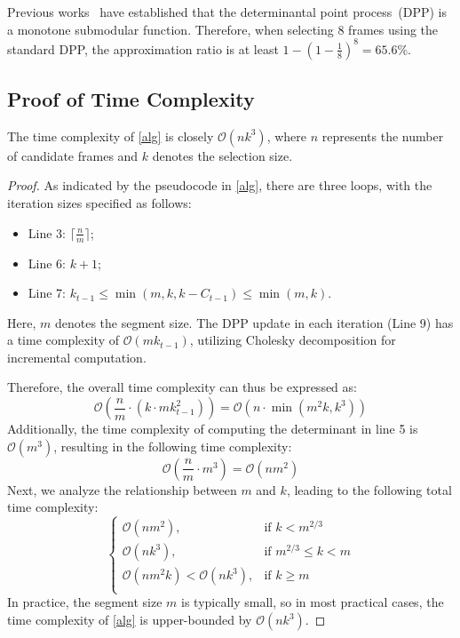 Previous works~\cite{fujishige2005submodular,krause2014submodular} have established that the determinantal point process~(DPP) is a monotone submodular function.
Therefore, when selecting 8 frames using the standard DPP, the approximation ratio is at least \mbox{\( 1 - \left( 1 - \frac{1}{8} \right)^8 = 65.6\% \).}


\subsection{Proof of Time Complexity}
The time complexity of \cref{alg} is closely $\mathcal{O}(nk^3)$, where $n$ represents the number of candidate frames and $k$ denotes the selection size.


\begin{proof}
    As indicated by the pseudocode in \cref{alg}, there are three loops, with the iteration sizes specified as follows:
    \begin{itemize}
        \item Line 3: $\lceil \frac{n}{m} \rceil$;
        \item Line 6: $k + 1$;
        \item Line 7: $k_{t-1} \leq \min(m, k, k - C_{t-1}) \leq \min(m, k)$.
    \end{itemize}
    Here, $m$ denotes the segment size. 
    The DPP update in each iteration (Line 9) has a time complexity of $\mathcal{O}(mk_{t-1})$, utilizing Cholesky decomposition for incremental computation.

    Therefore, the overall time complexity can thus be expressed as:
    \begin{equation}
        \mathcal{O}\left(
            \frac{n}{m} \cdot (k \cdot mk_{t-1}^2 ) 
        \right) = \mathcal{O}\left(
            n \cdot \min(m^2k, k^3)  
        \right)
    \end{equation}
    Additionally, the time complexity of computing the determinant in line 5 is $\mathcal{O}(m^3)$, resulting in the following time complexity:
    \begin{equation}
        \mathcal{O}\left(
            \frac{n}{m} \cdot m^3
        \right) = \mathcal{O}\left(
            n m^2
        \right)
    \end{equation}
    Next, we analyze the relationship between $m$ and $k$, leading to the following total time complexity:
    \begin{equation}
        \left\{
            \begin{array}{ll}
                \mathcal{O}(nm^2),  & \text{if } k < m^{2/3} \\
                \mathcal{O}(nk^3),  & \text{if } m^{2/3} \leq k < m  \\
                \mathcal{O}(nm^2k) < \mathcal{O}(nk^3), & \text{if } k \geq m \\
            \end{array}
        \right.
    \end{equation}
    In practice, the segment size $m$ is typically small, so in most practical cases, the time complexity of \cref{alg} is upper-bounded by $\mathcal{O}(nk^3)$.
\end{proof}
